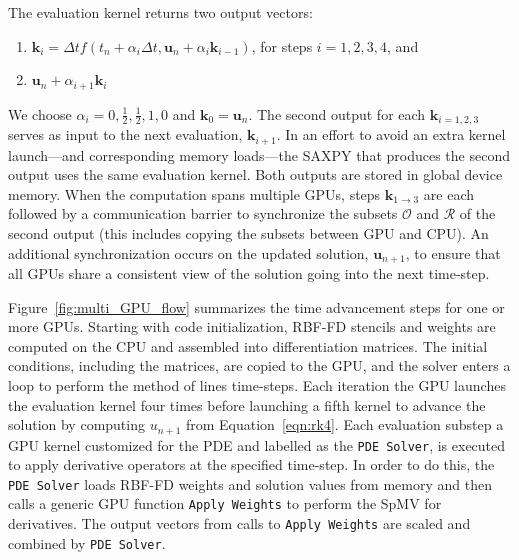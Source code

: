 \documentclass{report}
\begin{document}
 The evaluation kernel returns two output vectors: 
\begin{enumerate} 
\item $\mathbf{k}_i = \Delta t f(t_n + \alpha_{i} \Delta t, \mathbf{u}_n + \alpha_{i} \mathbf{k}_{i-1})$, for steps $i=1,2,3,4$, and
\item  $\mathbf{u}_n + \alpha_{i+1} \mathbf{k}_i$
\end{enumerate} 
We choose $\alpha_{i}=0, \frac{1}{2}, \frac{1}{2}, 1, 0$ and $\mathbf{k}_{0} = \mathbf{u}_n$. The second output for each $\mathbf{k}_{i=1,2,3}$ serves as input to the next evaluation, $\mathbf{k}_{i+1}$. In an effort to avoid an extra kernel launch---and corresponding memory loads---the SAXPY that produces the second output uses the same evaluation kernel. Both outputs are stored in global device memory. When the computation spans multiple GPUs, steps $\mathbf{k}_{1\rightarrow3}$ are each followed by a communication barrier to synchronize the subsets $\mathcal{O}$ and $\mathcal{R}$ of the second output (this includes copying the subsets between GPU and CPU). An additional synchronization occurs on the updated solution, $\mathbf{u}_{n+1}$, to ensure that all GPUs share a consistent view of the solution going into the next time-step.

Figure~\ref{fig:multi_GPU_flow} summarizes the time advancement steps for one or more GPUs. Starting with code initialization, RBF-FD stencils and weights are computed on the CPU and assembled into differentiation matrices. The initial conditions, including the matrices, are copied to the GPU, and the solver enters a loop to perform the method of lines time-steps. Each iteration the GPU launches the evaluation kernel four times before launching a fifth kernel to advance the solution by computing $u_{n+1}$ from Equation~\ref{eqn:rk4}. Each evaluation substep a GPU kernel customized for the PDE and labelled as the \texttt{PDE Solver}, is executed to apply derivative operators at the specified time-step. In order to do this, the \texttt{PDE Solver} loads RBF-FD weights and solution values from memory and then calls a generic GPU function \texttt{Apply Weights} to perform the SpMV for derivatives. The output vectors from calls to \texttt{Apply Weights} are scaled and combined by \texttt{PDE Solver}. %
\end{document}
